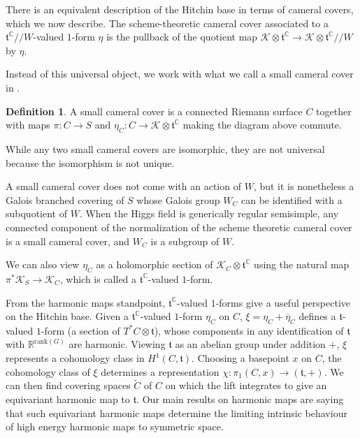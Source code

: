 \documentclass[10pt]{amsart}
\newcommand{\R}{\mathbb R}
\newcommand{\ft}{\mathfrak{t}}
\theoremstyle{definition}
\newtheorem{defn}[thm]{Definition}
\DeclareMathOperator{\C}{\mathbb{C}}
\begin{document}
There is an equivalent description of the Hitchin base in terms of cameral covers, which we now describe. The scheme-theoretic cameral cover associated to a $\ft^{\C}//W$-valued $1$-form $\eta$ is the pullback of the quotient map $\mathcal{K} \otimes \ft^{\C} \to \mathcal{K} \otimes \ft^{\C} // W$ by $\eta$.
    \begin{center}
    \end{center}
Instead of this universal object, we work with what we call a small cameral cover in \cite[section 3.2]{SS}.
\begin{defn}
    A small cameral cover is a connected Riemann surface $C$ together with maps $\pi:C\to S$ and $\eta_C: C\to \mathcal{K}\otimes \ft^{\C}$ making the diagram above commute.
\end{defn}
While any two small cameral covers are isomorphic, they are not universal because the isomorphism is not unique.

A small cameral cover does not come with an action of $W$, but it is nonetheless a Galois branched covering of $S$ whose Galois group $W_C$ can be identified with a subquotient of $W$. When the Higgs field is generically regular semisimple, any connected component of the normalization of the scheme theoretic cameral cover is a small cameral cover, and $W_C$ is a subgroup of $W$.

We can also view $\eta_C$ as a holomorphic section of $\mathcal{K}_C \otimes \ft^{\C}$ using the natural map $\pi^*\mathcal{K}_S \to \mathcal{K}_C$, which is called a $\ft^{\C}$-valued $1$-form.


From the harmonic maps standpoint, $\ft^{\C}$-valued $1$-forms give a useful perspective on the Hitchin base. Given a $\ft^{\C}$-valued $1$-form $\eta_C$ on $C$, $\xi=\eta_C+\overline{\eta}_C$ defines a $\ft$-valued $1$-form (a section of $T^*C\otimes \ft$), whose components in any identification of $\ft$ with $\R^{\textrm{rank}(G)}$ are harmonic. Viewing $\ft$ as an abelian group under addition $+$, $\xi$ represents a cohomology class in $H^1(C,\ft)$. Choosing a basepoint $x$ on $C$, the cohomology class of $\xi$ determines a representation $\chi: \pi_1(C,x)\to (\ft,+).$ We can then find covering spaces $\tilde{C}$ of $C$ on which the lift integrates to give an equivariant harmonic map to $\ft$. Our main results on harmonic maps are saying that such equivariant harmonic maps determine the limiting intrinsic behaviour of high energy harmonic maps to symmetric space.
\end{document}
